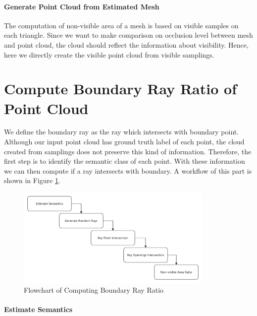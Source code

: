 \documentclass[11pt, a4paper,oneside,chapterprefix=false]{scrbook}
\begin{document}
\paragraph{Generate Point Cloud from Estimated Mesh} \label{par:generate point cloud from estimated mesh}

The computation of non-visible area of a mesh is based on visible samples on each triangle. Since we want to make comparison on occlusion level between mesh and point cloud, the cloud should reflect the information about visibility. Hence, here we directly create the visible point cloud from visible samplings.

\section{Compute Boundary Ray Ratio of Point Cloud} \label{compute boundary ray ratio of point cloud} 

We define the boundary ray as the ray which intersects with boundary point. Although our input point cloud has ground truth label of each point, the cloud created from samplings does not preserve this kind of information. Therefore, the first step is to identify the semantic class of each point. With these information we can then compute if a ray intersects with boundary. A workflow of this part is shown in Figure \ref{fig:flowchart of computing boundary ray ratio}.

\begin{figure}[H]
    \centering
    \includegraphics*[width=0.85\textwidth]{figures/Compute Boundary Ray Ratio of Point Cloud.png}
    \caption{Flowchart of Computing Boundary Ray Ratio}
    \label{fig:flowchart of computing boundary ray ratio}
\end{figure}

\paragraph{Estimate Semantics}
\end{document}
